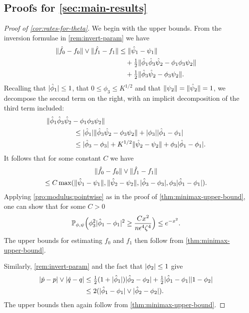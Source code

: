 \documentclass[journal]{IEEEtran}
\newcommand{\1}{\boldsymbol{1}}
\newcommand{\PP}{\mathbb{P}}
\DeclarePairedDelimiter{\brackets}{(}{)}
\DeclarePairedDelimiter{\norm}{\lVert}{\rVert}
\DeclarePairedDelimiter{\abs}{\lvert}{\rvert}
\begin{document}
\subsection{Proofs for \cref{sec:main-results}}
\begin{proof}[Proof of \cref{cor:rates-for-theta}]
	We begin with the upper bounds. From the inversion formulae in \cref{rem:invert-param} we have
	\begin{align*}
          \norm{\hat{f}_0-f_0} \vee \norm{\hat{f}_1-f_1}%
          &\leq \norm{\hat{\psi}_1-\psi_1}\\
          &\quad+\tfrac{1}{2}\norm{\hat{\phi}_1\hat{\phi}_3 \hat{\psi}_2-\phi_1\phi_3\psi_2}\\
          &\quad+\tfrac{1}{2}\norm{\hat{\phi}_3\hat{\psi}_2-\phi_3\psi_2}.
	\end{align*}
	Recalling that $\abs{\hat{\phi}_1}\leq 1$, that $0\leq \phi_3\leq K^{1/2}$ and that $\norm{\psi_2}=\norm{\hat{\psi}_2}=1$, we decompose the second term on the right, with an implicit decomposition of the third term included:
	\begin{align*}
          &\norm{\hat{\phi}_1\hat{\phi}_3\hat{\psi}_2-\phi_1\phi_3\psi_2}\\
          &\qquad\qquad \leq \abs{\hat{\phi}_1}\norm{\hat{\phi}_3\hat{\psi}_2-\phi_3\psi_2}+\abs{\phi_3}\abs{\hat{\phi}_1-\phi_1}\\
		&\qquad\qquad \leq \abs{\hat{\phi}_3-\phi_3}+K^{1/2}\norm{\hat{\psi}_2-\psi_2} + \phi_3 \abs{\hat{\phi}_1-\phi_1}.
	\end{align*}
	It follows that for some constant $C$ we have
        \begin{multline*}
          \norm{\hat{f}_0-f_0} \vee\norm{\hat{f}_1-f_1}\\
          \leq C\max(\norm{\hat{\psi}_1-\psi_1},\norm{\hat{\psi}_2-\psi_2},\abs{\hat{\phi}_3-\phi_3},\phi_3\abs{\hat{\phi}_1-\phi_1}).
        \end{multline*}
	Applying \cref{pro:modulus:pointwise} as in the proof of \cref{thm:minimax-upper-bound}, one can show that for some $C>0$
	\[ \PP_{\phi,\psi}\brackets[\Big]{\phi_3^2\abs{\hat{\phi}_1-\phi_1}^2\geq \frac{Cx^2}{n\epsilon^4\zeta^4}} \leq e^{-x^2}.\] The upper bounds for estimating $f_0$ and $f_1$ then follow from \cref{thm:minimax-upper-bound}.

	Similarly, \cref{rem:invert-param}
	and the fact that $\abs{\phi_2}\leq 1$ give
	\begin{align*}
          \abs{\hat{p}-p} \vee \abs{\hat{q}-q}%
          &\leq  \tfrac{1}{2}(1+\abs{\hat{\phi}_1})\abs{\hat{\phi}_2-\phi_2}+\tfrac{1}{2}\abs{\hat{\phi}_1-\phi_1}\abs{1-\phi_2}\\
          &\leq 2(\abs{\hat{\phi}_1-\phi_1} \vee \abs{\hat{\phi}_2-\phi_2}).
        \end{align*}
	The upper bounds then again follow from \cref{thm:minimax-upper-bound}.


\end{proof}
\end{document}
